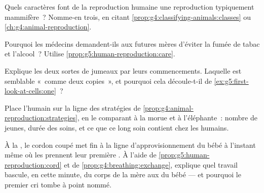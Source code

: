 \begin{exercise}[$\star$]\label{exo:g5:human-reproduction:7}
Quels caractères font de la reproduction humaine une reproduction
typiquement mammifère~? Nomme-en trois, en citant
\cref{prop:g4:classifying-animals:classes} ou
\cref{ch:g4:animal-reproduction}.
\end{exercise}

\begin{exercise}[$\star$]\label{exo:g5:human-reproduction:8}
Pourquoi les médecins demandent-ils aux futures mères d'éviter la
fumée de tabac et l'alcool~? Utilise
\cref{prop:g5:human-reproduction:care}.
\end{exercise}

\begin{exercise}[$\star\star$]\label{exo:g5:human-reproduction:9}
Explique les deux sortes de jumeaux par leurs commencements.
Laquelle est semblable «~comme deux copies~», et pourquoi cela
découle-t-il de \cref{ex:g5:first-look-at-cells:one}~?
\end{exercise}

\begin{exercise}[$\star\star$]\label{exo:g5:human-reproduction:10}
Place l'humain sur la ligne des stratégies de
\cref{prop:g4:animal-reproduction:strategies}, en le comparant à la
morue et à l'éléphante~: nombre de jeunes, durée des soins, et ce
que ce long soin contient chez les humains.
\end{exercise}

\begin{exercise}[$\star\star\star$]\label{exo:g5:human-reproduction:11}
À la , le cordon coupé met fin à la ligne
d'approvisionnement du bébé à l'instant même où les  prennent
leur première . À l'aide de
\cref{prop:g5:human-reproduction:cord} et de
\cref{prop:g4:breathing:exchange}, explique quel travail bascule, en
cette minute, du corps de la mère aux  du bébé --- et
pourquoi le premier cri tombe à point nommé.
\end{exercise}
